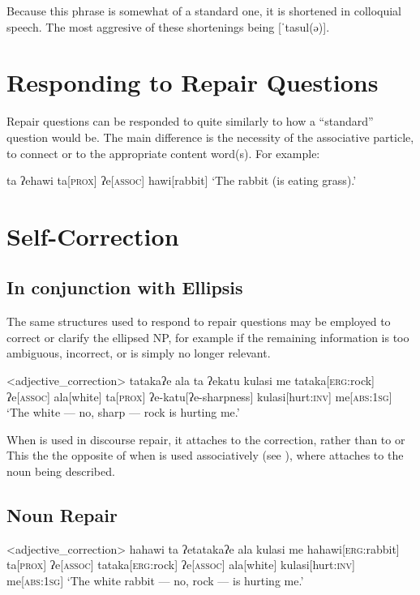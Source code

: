 Because this phrase is somewhat of a standard one, it is shortened in colloquial speech.
The most aggresive of these shortenings being [ˈtasul(ə)].

\section{Responding to Repair Questions}\label{sec:repair_response}

Repair questions can be responded to quite similarly to how a ``standard'' question would be.
The main difference is the necessity of the associative particle,  to connect  or  to the appropriate content word(s).
For example:

\ex
\begingl
\glpreamble ta ʔehawi
\endpreamble
ta[\textsc{prox}]
ʔe[\textsc{assoc}]
hawi[rabbit]
\glft `The rabbit (is eating grass).'
\endgl
\xe
\section{Self-Correction}
\subsection{In conjunction with  Ellipsis}

The same structures used to respond to repair questions may be employed to correct or clarify the ellipsed NP, for example if the remaining information is too ambiguous, incorrect, or is simply no longer relevant.

\ex<adjective_correction>
\begingl
\glpreamble tatakaʔe ala ta ʔekatu kulasi me
\endpreamble
tataka[\textsc{erg:}rock]
ʔe[\textsc{assoc}]
ala[white]
ta[\textsc{prox}]
ʔe-katu[ʔe-sharpness]
kulasi[hurt\textsc{:inv}]
me[\textsc{abs:1sg}]
\glft `The white --- no, sharp --- rock is hurting me.'
\endgl
\xe

When  is used in discourse repair, it attaches to the correction, rather than to  or  This the the opposite of when  is used associatively (see ), where  attaches to the noun being described.


\subsection{Noun Repair}
\ex<adjective_correction>
\begingl
\glpreamble hahawi ta ʔetatakaʔe ala kulasi me
\endpreamble
hahawi[\textsc{erg:}rabbit]
ta[\textsc{prox}]
ʔe[\textsc{assoc}]
tataka[\textsc{erg:}rock]
ʔe[\textsc{assoc}]
ala[white]
kulasi[hurt\textsc{:inv}]
me[\textsc{abs:1sg}]
\glft `The white rabbit --- no, rock ---  is hurting me.'
\endgl
\xe

